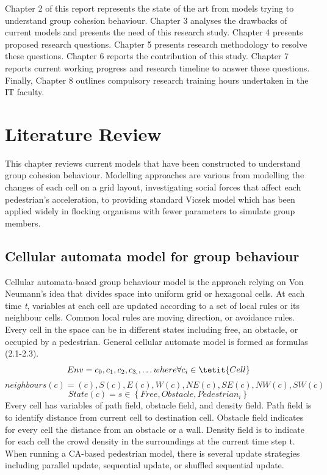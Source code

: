 \documentclass[a4paper,11pt,phdthesis,singlespace,twoside]{cssethesis}
\begin{document}
Chapter 2 of this report represents the state of the art from models trying to understand group cohesion behaviour. Chapter 3 analyses the drawbacks of current models and presents the need of this research study. Chapter 4 presents proposed research questions. Chapter 5 presents research methodology to resolve these questions. Chapter 6 reports the contribution of this study. Chapter 7 reports current working progress and research timeline to answer these questions. Finally, Chapter 8 outlines compulsory research training hours undertaken in the IT faculty.

\chapter{Literature Review}

This chapter reviews current models that have been constructed to understand group cohesion behaviour. Modelling approaches are various from modelling the changes of each cell on a grid layout, investigating social forces that affect each pedestrian’s acceleration, to providing standard Vicsek model which has been applied widely in flocking organisms with fewer parameters to simulate group members.

\section{Cellular automata model for group behaviour}
Cellular automata-based group behaviour model is the approach relying on Von Neumann's idea that divides space into uniform grid or hexagonal cells. At each time \textit{t}, variables at each cell are updated according to a set of local rules or its neighbour cells. Common local rules are moving direction, or avoidance rules. Every cell in the space can be in different states including free, an obstacle, or occupied by a pedestrian. General cellular automate model is formed as formulas (2.1-2.3).
\begin{equation}
Env = c_{0},c_{1},c_{2},c_{3,},\ldots where\/ \forall c_{i} \in \tetit{Cell}
\end{equation}
\begin{equation}
neighbours(c) = {(c),S(c),E(c),W(c),NE(c),SE (c),NW(c),SW(c)}
\end{equation}
\begin{equation}
State(c)= s \in \left \{Free,Obstacle,Pedestrian_{i}\right \}
\end{equation}
Every cell has variables of path field, obstacle field, and density field. Path field is to identify distance from current cell to destination cell. Obstacle field indicates for every cell the distance from an obstacle or a wall. Density field is to indicate for each cell the crowd density in the surroundings at the current time step t. When running a CA-based pedestrian model, there is several update strategies including parallel update, sequential update, or shuffled sequential update. 
\end{document}
